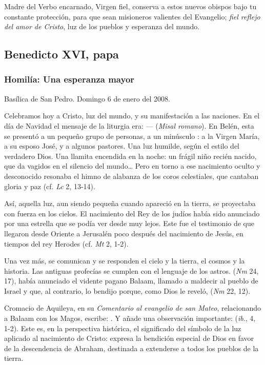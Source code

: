\begin{body}
\begin{body}
{Madre del Verbo encarnado, Virgen fiel, conserva a estos nuevos obispos bajo tu constante protección, para que sean misioneros valientes del Evangelio; \emph{fiel reflejo del amor de Cristo}, luz de los pueblos y esperanza del mundo.

\subsection{Benedicto XVI, papa}

\subsubsection{Homilía: Una esperanza mayor}

Basílica de San Pedro. Domingo 6 de enero del 2008.

Celebramos hoy a Cristo, luz del mundo, y su manifestación a las naciones. En el día de Navidad el mensaje de la liturgia era:  ---  (\emph{Misal romano}). En Belén, esta  se presentó a un pequeño grupo de personas, a un minúsculo : a la Virgen María, a su esposo José, y a algunos pastores. Una luz humilde, según el estilo del verdadero Dios. Una llamita encendida en la noche: un frágil niño recién nacido, que da vagidos en el silencio del mundo\ldots{} Pero en torno a ese nacimiento oculto y desconocido resonaba el himno de alabanza de los coros celestiales, que cantaban gloria y paz (cf. \emph{Lc} 2, 13-14).

Así, aquella luz, aun siendo pequeña cuando apareció en la tierra, se proyectaba con fuerza en los cielos. El nacimiento del Rey de los judíos había sido anunciado por una estrella que se podía ver desde muy lejos. Este fue el testimonio de  que llegaron desde Oriente a Jerusalén poco después del nacimiento de Jesús, en tiempos del rey Herodes (cf. \emph{Mt} 2, 1-2).

Una vez más, se comunican y se responden el cielo y la tierra, el cosmos y la historia. Las antiguas profecías se cumplen con el lenguaje de los astros.  (\emph{Nm} 24, 17), había anunciado el vidente pagano Balaam, llamado a maldecir al pueblo de Israel y que, al contrario, lo bendijo porque, como Dios le reveló,  (\emph{Nm} 22, 12).

Cromacio de Aquileya, en su \emph{Comentario al evangelio de san Mateo}, relacionando a Balaam con los Magos, escribe: . Y añade una observación importante:  (\emph{ib}., 4, 1-2). Este es, en la perspectiva histórica, el significado del símbolo de la luz aplicado al nacimiento de Cristo: expresa la bendición especial de Dios en favor de la descendencia de Abraham, destinada a extenderse a todos los pueblos de la tierra.

}
\end{body}
\end{body}
